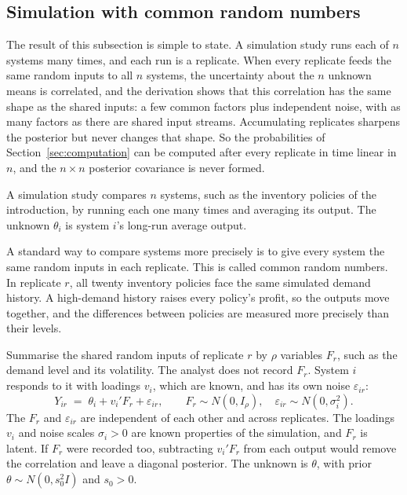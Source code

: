 \documentclass[11pt]{article}
\begin{document}
\subsection{Simulation with common random numbers}
\label{sec:crn}

The result of this subsection is simple to state. A simulation study
runs each of $n$ systems many times, and each run is a replicate.
When every replicate feeds the same random inputs to all $n$ systems,
the uncertainty about the $n$ unknown means is correlated, and the
derivation shows that this correlation has the same shape as the
shared inputs: a few common factors plus independent noise, with as
many factors as there are shared input streams. Accumulating replicates sharpens
the posterior but never changes that shape. So the probabilities of Section~\ref{sec:computation} can be computed after every replicate
in time linear in $n$, and the $n \times n$ posterior covariance is never formed.

A simulation study compares $n$ systems, such as the inventory
policies of the introduction, by running each one many times and averaging its output. The unknown
$\theta_i$ is system $i$'s long-run average output.

A standard way to compare systems more precisely is to give every
system the same random inputs in each replicate. This is called
common random numbers. In replicate $r$, all twenty inventory policies
face the same simulated demand history. A high-demand history raises
every policy's profit, so the outputs move together, and the
differences between policies are measured more precisely than their
levels.

Summarise the shared random inputs of replicate $r$ by $\rho$
variables $F_r$, such as the demand level and its volatility. The
analyst does not record $F_r$. System $i$ responds to it with
loadings $v_i$, which are known, and has its own noise
$\varepsilon_{ir}$:
\begin{equation}
Y_{ir} \;=\; \theta_i + v_i' F_r + \varepsilon_{ir}, \qquad
F_r \sim N(0, I_\rho), \quad \varepsilon_{ir} \sim N(0, \sigma_i^2).
\end{equation}
The $F_r$ and $\varepsilon_{ir}$ are independent of each other and
across replicates. The loadings $v_i$ and noise scales $\sigma_i > 0$
are known properties of the simulation, and $F_r$ is latent. If
$F_r$ were recorded too, subtracting $v_i' F_r$ from each output would
remove the correlation and leave a diagonal posterior. The unknown is
$\theta$, with prior $\theta \sim N(0, s_0^2 I)$ and $s_0 > 0$.
\end{document}
